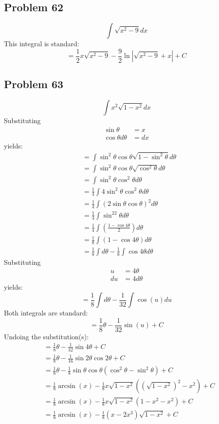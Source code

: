 \documentclass{article}
\begin{document}
\subsection*{Problem 62}
$$\int\sqrt{x^2-9}dx$$
This integral is standard:
$$=\frac{1}{2}x\sqrt{x^2-9}-\frac{9}{2}\ln\left|\sqrt{x^2-9}+x\right|+C$$
\subsection*{Problem 63}
$$\int x^2\sqrt{1-x^2}dx$$
Substituting
\begin{align*}
\sin\theta&=x \\
\cos\theta d\theta&=dx
\end{align*}
yields:
\begin{align*}
&=\int\sin^2\theta\cos\theta\sqrt{1-\sin^2\theta}d\theta \\
&=\int\sin^2\theta\cos\theta\sqrt{\cos^2\theta}d\theta \\
&=\int\sin^2\theta\cos^2\theta d\theta \\
&=\frac{1}{4}\int4\sin^2\theta\cos^2\theta d\theta \\
&=\frac{1}{4}\int(2\sin\theta\cos\theta)^2 d\theta \\
&=\frac{1}{4}\int\sin^22\theta d\theta \\
&=\frac{1}{4}\int\left(\frac{1-\cos4\theta}{2}\right)d\theta \\
&=\frac{1}{8}\int(1-\cos4\theta)d\theta \\
&=\frac{1}{8}\int d\theta-\frac{1}{8}\int\cos4\theta d\theta
\end{align*}
Substituting
\begin{align*}
u&=4\theta \\
du&=4d\theta
\end{align*}
yields:
$$=\frac{1}{8}\int d\theta-\frac{1}{32}\int\cos(u)du$$
Both integrals are standard:
$$=\frac{1}{8}\theta-\frac{1}{32}\sin(u)+C$$
Undoing the substitution(s):
\begin{align*}
&=\frac{1}{8}\theta-\frac{1}{32}\sin4\theta+C \\
&=\frac{1}{8}\theta-\frac{1}{16}\sin2\theta\cos2\theta+C \\
&=\frac{1}{8}\theta-\frac{1}{8}\sin\theta\cos\theta(\cos^2\theta-\sin^2\theta)+C \\
&=\frac{1}{8}\arcsin(x)-\frac{1}{8}x\sqrt{1-x^2}\left(\left(\sqrt{1-x^2}\right)^2-x^2\right)+C \\
&=\frac{1}{8}\arcsin(x)-\frac{1}{8}x\sqrt{1-x^2}(1-x^2-x^2)+C \\
&=\frac{1}{8}\arcsin(x)-\frac{1}{8}(x-2x^3)\sqrt{1-x^2}+C
\end{align*}
\end{document}
